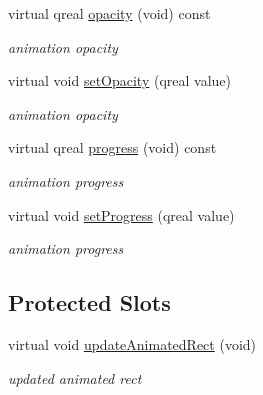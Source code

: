 \begin{DoxyCompactItemize}
\mbox{\label{class_tool_bar_data_a098ffa0ed3e3bd62b6d05c97cd9ed150}} 
virtual qreal \hyperlink{class_tool_bar_data_a098ffa0ed3e3bd62b6d05c97cd9ed150}{opacity} (void) const
\begin{DoxyCompactList}\small\item\em animation opacity \end{DoxyCompactList}\item 
\mbox{\label{class_tool_bar_data_a05c4f3505adcf78738c7fa2f31f8439f}} 
virtual void \hyperlink{class_tool_bar_data_a05c4f3505adcf78738c7fa2f31f8439f}{set\+Opacity} (qreal value)
\begin{DoxyCompactList}\small\item\em animation opacity \end{DoxyCompactList}\item 
\mbox{\label{class_tool_bar_data_af57e6122acb813a0ebd221a3eae9edc7}} 
virtual qreal \hyperlink{class_tool_bar_data_af57e6122acb813a0ebd221a3eae9edc7}{progress} (void) const
\begin{DoxyCompactList}\small\item\em animation progress \end{DoxyCompactList}\item 
\mbox{\label{class_tool_bar_data_a593b788f0e051303e786e7ae4a73eff1}} 
virtual void \hyperlink{class_tool_bar_data_a593b788f0e051303e786e7ae4a73eff1}{set\+Progress} (qreal value)
\begin{DoxyCompactList}\small\item\em animation progress \end{DoxyCompactList}\end{DoxyCompactItemize}
\subsection*{Protected Slots}
\begin{DoxyCompactItemize}
\item 
\mbox{\label{class_tool_bar_data_afb6da4f1790356161518ce57260b01f8}} 
virtual void \hyperlink{class_tool_bar_data_afb6da4f1790356161518ce57260b01f8}{update\+Animated\+Rect} (void)
\begin{DoxyCompactList}\small\item\em updated animated rect \end{DoxyCompactList}\end{DoxyCompactItemize}
